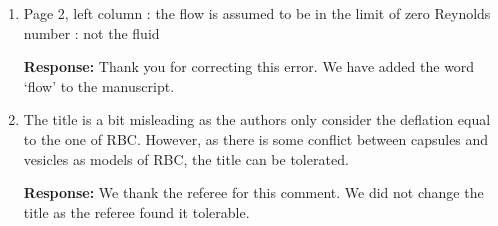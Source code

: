 \documentclass[11pt]{article}
\begin{document}
\begin{enumerate}
\item Page 2, left column : the flow is assumed to be in the limit of
  zero Reynolds number : not the fluid

\noindent
{\bf Response:} Thank you for correcting this error. We have added the
word `flow' to the manuscript.

\item The title is a bit misleading as the authors only consider the
  deflation equal to the one of RBC. However, as there is some conflict
  between capsules and vesicles as models of RBC, the title can be
  tolerated.

\noindent
{\bf Response:} We thank the referee for this comment. We did not change the title as the referee found it tolerable.
\end{enumerate}
\end{document}
